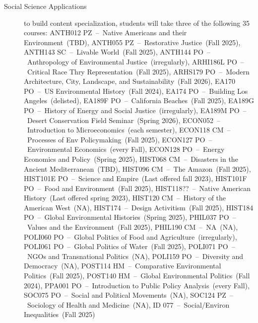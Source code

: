 \documentclass{article}\usepackage[]{graphicx}\usepackage[]{xcolor}
\begin{document}
\begin{description}
\item[Social Science Applications] to build content specialization, students will take three of the following 35 courses: ANTH012 PZ~--~Native Americans and their Environment~(TBD), ANTH055 PZ~--~Restorative Justice~(Fall 2025), ANTH143 SC~--~Livable World~(Fall 2025), ANTH144 PO~--~Anthropology of Environmental Justice~(irregularly), ARHI186L PO~--~Critical Race Thry Representation~(Fall 2025), ARHS179 PO~--~Modern Architecture, City, Landscape, and Sustainability~(Fall 2026), EA170 PO~--~US Environmental History~(Fall 2024), EA174 PO~--~Building Los Angeles~(delisted), EA189F PO~--~California Beaches~(Fall 2025), EA189G PO~--~History of Energy and Social Justice~(irregularly), EA189M PO~--~Desert Conservation Field Seminar~(Spring 2026), ECON052~--~Introduction to Microeconomics~(each semester), ECON118 CM~--~Processes of Env Policymaking~(Fall 2025), ECON127 PO~--~Environmental Economics~(every  Fall), ECON128 PO~--~Energy Economics and Policy~(Spring 2025), HIST068 CM~--~Disasters in the Ancient Mediterranean~(TBD), HIST096 CM~--~The Amazon~(Fall 2025), HIST101E PO~--~Science and Empire~(Last offered fall 2023), HIST101F PO~--~Food and Environment~(Fall 2025), HIST118??~--~Native American History~(Last offered spring 2023), HIST120 CM~--~History of the American West~(NA), HIST174~--~Design Activitism~(Fall 2025), HIST184 PO~--~Global Environmental Histories~(Spring 2025), PHIL037 PO~--~Values and the Environment~(Fall 2025), PHIL190 CM~--~NA~(NA), POLI060 PO~--~Global Politics of Food and Agriculture~(irregularly), POLI061 PO~--~Global Politics of Water~(Fall 2025), POLI071 PO~--~NGOs and Transnational Politics~(NA), POLI159 PO~--~Diversity and Democracy~(NA), POST114 HM~--~Comparative Environmental Politics~(Fall 2025), POST140 HM~--~Global Environmental Politics~(Fall 2024), PPA001 PO~--~Introduction to Public Policy Analysis~(every  Fall), SOC075 PO~--~Social and Political Movements~(NA), SOC124 PZ~--~Sociology of Health and Medicine~(NA), ID 077~--~Social/Environ Inequalities~(Fall 2025)



\end{description}
\end{document}

